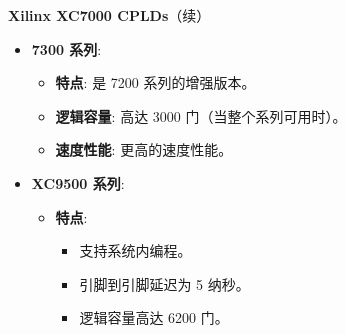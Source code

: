 \documentclass[
  ignorenonframetext,
  chinese,
]{beamer}
\providecommand{\tightlist}{%
  \setlength{\itemsep}{0pt}\setlength{\parskip}{0pt}}
\begin{document}
\begin{frame}
\begin{block}{\textbf{Xilinx XC7000 CPLDs}（续）}
\begin{itemize}
\tightlist
\item
  \textbf{7300 系列}:

  \begin{itemize}
  \tightlist
  \item
    \textbf{特点}: 是 7200 系列的增强版本。
  \item
    \textbf{逻辑容量}: 高达 3000 门（当整个系列可用时）。
  \item
    \textbf{速度性能}: 更高的速度性能。
  \end{itemize}
\item
  \textbf{XC9500 系列}:

  \begin{itemize}
  \tightlist
  \item
    \textbf{特点}:

    \begin{itemize}
    \tightlist
    \item
      支持系统内编程。
    \item
      引脚到引脚延迟为 5 纳秒。
    \item
      逻辑容量高达 6200 门。
    \end{itemize}
  \end{itemize}
\end{itemize}
\end{block}
\end{frame}
\end{document}
